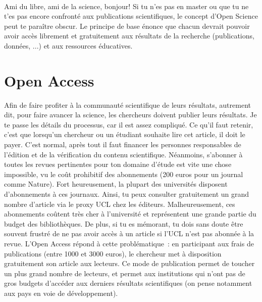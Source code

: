 \documentclass{../fiche}
\begin{document}
\paragraph{}
Ami du libre, ami de la science, bonjour!
Si tu n'es pas en master ou que tu ne t'es pas encore confronté aux publications scientifiques, le concept d’Open Science peut te paraître obscur.
Le principe de base énonce que chacun devrait pouvoir avoir accès librement et gratuitement aux résultats de la recherche (publications, données, ...) et aux ressources éducatives.

\section{Open Access}
Afin de faire profiter à la communauté scientifique de leurs résultats, autrement dit, pour faire avancer la science, les chercheurs doivent publier leurs résultats. Je te passe les détails du processus, car il est assez compliqué. Ce qu’il faut retenir, c’est que lorsqu’un chercheur ou un étudiant souhaite lire cet article, il doit le payer. C’est normal, après tout il faut financer les personnes responsables de l’édition et de la vérification du contenu scientifique. Néanmoins, s’abonner à toutes les revues pertinentes pour ton domaine d’étude est vite une chose impossible, vu le coût prohibitif des abonnements (200 euros pour un journal comme Nature). Fort heureusement, la plupart des universités disposent d'abonnements à ces journaux. Ainsi, tu peux consulter gratuitement un grand nombre d'article via le proxy UCL chez les éditeurs. Malheureusement, ces abonnements coûtent très cher à l'université et représentent une grande partie du budget des bibliothèques. De plus, si tu es mémorant, tu dois sans doute être souvent frustré de ne pas avoir accès à un article si l’UCL n’est pas abonnée à la revue. L’Open Access répond à cette problématique : en participant aux frais de publications (entre 1000 et 3000 euros), le chercheur met à disposition gratuitement son article aux lecteurs. Ce mode de publication permet de toucher un plus grand nombre de lecteurs, et permet aux institutions qui n’ont pas de gros budgets d’accéder aux derniers résultats scientifiques (on pense notamment aux pays en voie de développement).
\end{document}
